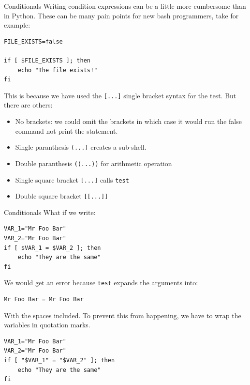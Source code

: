 \documentclass[10pt]{beamer}
\begin{document}
\begin{frame}[label={sec:org5e4ad39},fragile]{Conditionals}
 Writing condition expressions can be a little more cumbersome than in
Python. These can be many pain points for new bash programmers, take for
example:

\begin{verbatim}
FILE_EXISTS=false

if [ $FILE_EXISTS ]; then
    echo "The file exists!"
fi
\end{verbatim}

This is because we have used the \texttt{[...]} single bracket syntax for the test. But
there are others:

\begin{itemize}
\item No brackets: we could omit the brackets in which case it would run the false
command not print the statement.
\item Single paranthesis \texttt{(...)} creates a sub-shell.
\item Double paranthesis \texttt{((...))} for arithmetic operation
\item Single square bracket \texttt{[...]} calls \texttt{test}
\item Double square bracket \texttt{[[...]]}
\end{itemize}
\end{frame}

\begin{frame}[label={sec:orgaa500fa},fragile]{Conditionals}
 What if we write:

\begin{verbatim}
VAR_1="Mr Foo Bar"
VAR_2="Mr Foo Bar"
if [ $VAR_1 = $VAR_2 ]; then
    echo "They are the same"
fi
\end{verbatim}

We would get an error because \texttt{test} expands the arguments into:

\begin{verbatim}
Mr Foo Bar = Mr Foo Bar
\end{verbatim}

With the spaces included. To prevent this from happening, we have to wrap the
variables in quotation marks.

\begin{verbatim}
VAR_1="Mr Foo Bar"
VAR_2="Mr Foo Bar"
if [ "$VAR_1" = "$VAR_2" ]; then
    echo "They are the same"
fi
\end{verbatim}
\end{frame}
\end{document}
